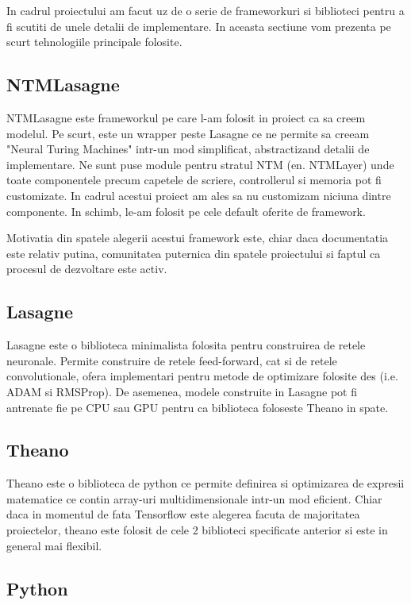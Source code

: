 \documentclass[12pt]{article}
\begin{document}
In cadrul proiectului am facut uz de o serie de frameworkuri si biblioteci pentru a fi scutiti de unele detalii de implementare. In aceasta sectiune vom prezenta pe scurt tehnologiile principale folosite.

\subsection{NTMLasagne}

NTMLasagne este frameworkul pe care l-am folosit in proiect ca sa creem modelul. Pe scurt, este un wrapper peste Lasagne  ce ne permite sa creeam "Neural Turing Machines" intr-un mod simplificat, abstractizand detalii de implementare. Ne sunt puse module pentru stratul NTM (en. NTMLayer) unde toate componentele precum capetele de scriere, controllerul si memoria pot fi customizate. In cadrul acestui proiect am ales sa nu customizam niciuna dintre componente. In schimb, le-am folosit pe cele default oferite de framework.

Motivatia din spatele alegerii acestui framework este, chiar daca documentatia este relativ putina, comunitatea puternica din spatele proiectului si faptul ca procesul de dezvoltare este activ.


\subsection{Lasagne}

Lasagne este o biblioteca minimalista folosita pentru construirea de retele neuronale. Permite construire de retele feed-forward, cat si de retele convolutionale, ofera implementari pentru metode de optimizare folosite des (i.e. ADAM si RMSProp). De asemenea, modele construite in Lasagne pot fi antrenate fie pe CPU sau GPU pentru ca biblioteca foloseste Theano in spate.


\subsection{Theano}

Theano este o biblioteca de python ce permite definirea si optimizarea de expresii matematice ce contin array-uri multidimensionale intr-un mod eficient. Chiar daca in momentul de fata Tensorflow este alegerea facuta de majoritatea proiectelor, theano este folosit de cele 2 biblioteci specificate anterior si este in general mai flexibil.

\subsection{Python}
\end{document}
